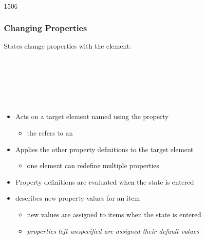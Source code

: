\begin{slide}{1506}\frametitle{Changing Properties}

States change properties with the  element:

\begin{qml}
\\
\\
\\
\\
\qtt{~~~~\}}\\
\end{qml}

\begin{itemize}
\item Acts on a target element named using the  property
  \begin{itemize}
  \item the  refers to an 
  \end{itemize}
\item Applies the other property definitions to the target element
  \begin{itemize}
  \item one  element can redefine multiple properties
  \end{itemize}
\item Property definitions are evaluated when the state is entered
\item {} describes new property values for an item
  \begin{itemize}
  \item new values are assigned to items when the state is entered
  \item \textit{properties left unspecified are assigned their default values}
  \end{itemize}
\end{itemize}



\end{slide}
